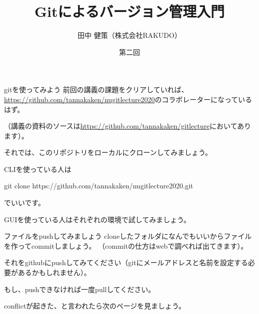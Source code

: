 \documentclass[12pt, unicode]{beamer}
\title{Gitによるバージョン管理入門}
\author{田中 健策（株式会社RAKUDO）}
\date[2020/12/11]{第二回}
\begin{document}
\frame{\maketitle}

\begin{frame}{gitを使ってみよう}
前回の講義の課題をクリアしていれば、\url{https://github.com/tannakaken/nugitlecture2020}のコラボレーターになっているはず。

（講義の資料のソースは\url{https://github.com/tannakaken/gitlecture}においてあります）。

それでは、このリポジトリをローカルにクローンしてみましょう。

CLIを使っている人は

git clone https://github.com/tannakaken/nugitlecture2020.git

でいいです。

GUIを使っている人はそれぞれの環境で試してみましょう。

\end{frame}

\begin{frame}{ファイルをpushしてみましょう}
cloneしたフォルダになんでもいいからファイルを作ってcommitしましょう。
（commitの仕方はwebで調べれば出てきます）。

それをgithubにpushしてみてください（gitにメールアドレスと名前を設定する必要があるかもしれません）。

もし、pushできなければ一度pullしてください。

conflictが起きた、と言われたら次のページを見ましょう。

\end{frame}
\end{document}
